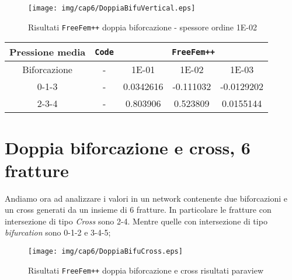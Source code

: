\begin{figure}[h!]
\centering
\texttt{[image: img/cap6/DoppiaBifuVertical.eps]}
\caption{Risultati \texttt{FreeFem++} doppia biforcazione - spessore ordine 1E-02 }\label{DoppiaBifuVertical1E-02}
\end{figure}

\begin{center}
\begin{tabular}{|c|c|c|c|c|}
\hline
 Pressione media & \textbf{\texttt{Code}} & \multicolumn{3}{|c|}{\textbf{\texttt{FreeFem++}}} \\ 
\hline
\multicolumn{1}{|c|}{Biforcazione} & - &
\multicolumn{1}{|c|}{1E-01} & 1E-02 & 1E-03 \\
\hline
  0-1-3 & - & 0.0342616 & -0.111032 & -0.0129202 \\
  2-3-4 & - & 0.803906 & 0.523809 & 0.0155144 \\
\hline
\end{tabular}
\end{center}

\section{Doppia biforcazione e cross, 6 fratture}
Andiamo ora ad analizzare i valori in un network contenente due biforcazioni e un cross generati da un insieme di 6 fratture. In particolare le fratture con intersezione di tipo \textit{Cross} sono 2-4. Mentre quelle con intersezione di tipo \textit{bifurcation} sono 0-1-2 e 3-4-5;\\

\begin{figure}[h!]
\centering
\texttt{[image: img/cap6/DoppiaBifuCross.eps]}
\caption{Risultati \texttt{FreeFem++} doppia biforcazione e cross risultati paraview }\label{DoppiaBifuCrossParaview}
\end{figure}

